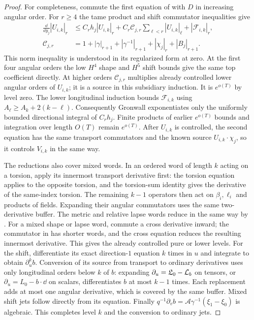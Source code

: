 \begin{proof}
For completeness, commute the first equation of
 with $D$ in increasing angular order.
For $r\ge4$ the tame product and shift commutator inequalities give
\[
\begin{aligned}
 \frac{\dd}{\dd y_j}|U_{i,k}|_r
 &\le C_rh_j|U_{i,k}|_r
   +C_r\mathcal C_{j,r}\sum_{\ell<r}|U_{i,k}|_\ell
   +|\mathcal F_{i,k}|_r,\\
 \mathcal C_{j,r}
 &=1+|\gamma|_{r+1}+|\gamma^{-1}|_{r+1}
                         +|\chi_j|_r+|B_j|_{r+1}.
\end{aligned}
\]
This norm inequality is understood in its regularized form at zero.
At the first four angular orders the low $H^4$ shape and $H^5$ shift
bounds give the same top coefficient directly.  At higher orders
$\mathcal C_{j,r}$ multiplies already controlled lower angular
orders of $U_{i,k}$; it is a source in this subsidiary induction.
It is $e^{o(T)}$ by level zero.  The lower longitudinal induction
bounds $\mathcal F_{i,k}$ using $A_\ell\ge A_k+2(k-\ell)$.
Consequently Gronwall exponentiates only the uniformly bounded
directional integral of $C_rh_j$.  Finite products of earlier
$e^{o(T)}$ bounds and integration over length $O(T)$ remain
$e^{o(T)}$.  After $U_{i,k}$ is controlled, the second equation has
the same transport commutators and the known source
$U_{i,k}\cdot\chi_j$, so it controls $V_{i,k}$ in the same way.

The reductions also cover mixed words.  In an ordered word of length
$k$ acting on a torsion, apply its innermost transport derivative
first: the torsion equation applies to the opposite torsion, and the
torsion-sum identity gives the derivative of the same-index torsion.
The remaining $k-1$ operators then act on $\beta_i,\ell_i$ and
products of fields.  Expanding their angular commutators uses the
same two-derivative buffer.  The metric and relative lapse words
reduce in the same way by .
For a mixed shape or lapse word, commute a cross derivative inward;
the commutator in  has shorter words,
and the cross equation reduces the resulting innermost derivative.
This gives the already controlled pure or lower levels.  For the shift,
differentiate its exact direction-$1$ equation $k$ times in $u$ and
integrate to obtain $\partial_u^kb$.  Conversion of its source from
transport to ordinary derivatives uses only longitudinal orders
below $k$ of $b$: expanding
$\partial_u=\mathfrak L_0-\mathcal L_b$ on tensors, or
$\partial_u=L_0-b\cdot\dd$ on scalars, differentiates $b$ at most
$k-1$ times.  Each replacement adds at most one angular derivative,
which is covered by the same buffer.  Mixed shift jets follow
directly from its equation.  Finally
$q^{-1}\partial_vb=\mathcal A\gamma^{-1}(\xi_1-\xi_0)$ is algebraic.
This completes level $k$ and the conversion to ordinary jets.


\end{proof}
